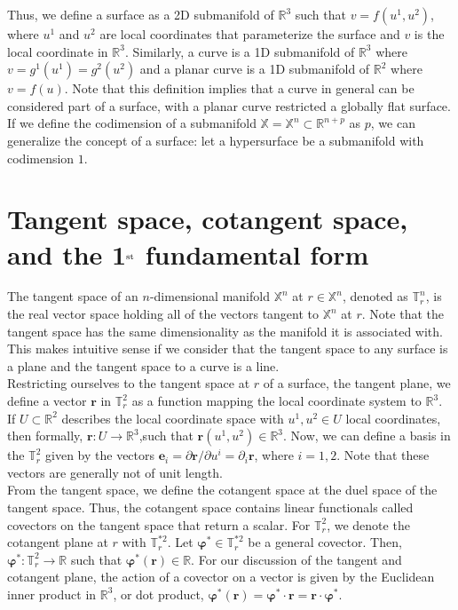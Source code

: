 \begin{appendices}
Thus, we define a surface as a 2D submanifold of $\mathbb{R}^3$ such that $v = f(u^1,u^2)$, where $u^1$ and $u^2$ are local coordinates that parameterize the surface and $v$ is the local coordinate in $\mathbb{R}^3$.
Similarly, a curve is a 1D submanifold of $\mathbb{R}^3$ where $v = g^1(u^1) = g^2(u^2)$ and a planar curve is a 1D submanifold of $\mathbb{R}^2$ where $v = f(u)$.
Note that this definition implies that a curve in general can be considered part of a surface, with a planar curve restricted a globally flat surface.
If we define the codimension of a submanifold $\mathbb{X} = \mathbb{X}^n \subset \mathbb{R}^{n + p}$ as $p$, we can generalize the concept of a surface: let a hypersurface be a submanifold with codimension $1$.




\section{Tangent space, cotangent space, and the 1$^{\rm st}$ fundamental form }
The tangent space of an $n$-dimensional manifold $\mathbb{X}^n$ at $r\in \mathbb{X}^n$, denoted as $\mathbb{T}^n_r$, is the real vector space holding all of the vectors tangent to $\mathbb{X}^n$ at $r$.
Note that the tangent space has the same dimensionality as the manifold it is associated with.
This makes intuitive sense if we consider that the tangent space to any surface is a plane and the tangent space to a curve is a line. \\

Restricting ourselves to the tangent space at $r$ of a surface, the tangent plane, we define a vector $\mathbf{r}$ in $\mathbb{T}^2_r$ as a function mapping the local coordinate system to $\mathbb{R}^3$.
If $U \subset \mathbb{R}^2$ describes the local coordinate space with $u^1,u^2 \in U$ local coordinates, then formally, $\mathbf{r}:U \rightarrow \mathbb{R}^3$,such that $\mathbf{r}(u^1,u^2) \in \mathbb{R}^3$.
Now, we can define a basis in the $\mathbb{T}^2_r$ given by the vectors $\mathbf{e}_i = \partial \mathbf{r} / \partial u^i = \partial_i \mathbf{r}$, where $i = 1,2$.
Note that these vectors are generally not of unit length. \\

From the tangent space, we define the cotangent space at the duel space of the tangent space.
Thus, the cotangent space contains linear functionals called covectors on the tangent space that return a scalar.
For $\mathbb{T}^2_r$, we denote the cotangent plane at $r$ with $\mathbb{T}^{*2}_r$.
Let $\bm{\varphi}^* \in \mathbb{T}^{*2}_r$ be a general covector.
Then, $\bm{\varphi}^*: \mathbb{T}^2_r \rightarrow \mathbb{R}$ such that $\bm{\varphi}^*(\mathbf{r}) \in \mathbb{R}$.
For our discussion of the tangent and cotangent plane, the action of a covector on a vector is given by the Euclidean inner product in $\mathbb{R}^3$, or dot product, $\bm{\varphi}^*(\mathbf{r}) = \bm{\varphi}^* \cdot \mathbf{r} = \mathbf{r} \cdot \bm{\varphi}^*$. \\


\end{appendices}
